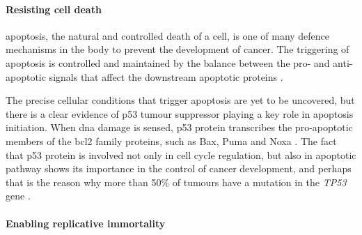 \paragraph{Resisting cell death}

\noindent
\Gls{apoptosis}, the natural and controlled death of a cell, is one of many defence mechanisms in the body to prevent the development of cancer.
The triggering of \gls{apoptosis} is controlled and maintained by the balance between the pro- and anti-apoptotic signals that affect the downstream apoptotic proteins \citep{Hanahan2011}.


The precise cellular conditions that trigger apoptosis are yet to be uncovered, but there is a clear evidence of p53 tumour suppressor playing a key role in apoptosis initiation.
When \acrshort{dna} damage is sensed, p53 protein transcribes the pro-apoptotic members of the \gls{bcl2} family proteins, such as Bax, Puma and Noxa \citep{Fridman2003,Hanahan2011}.
The fact that p53 protein is involved not only in cell cycle regulation, but also in apoptotic pathway shows its importance in the control of cancer development, and perhaps that is the reason why more than 50\% of tumours have a mutation in the \textit{TP53} gene \citep{Levine1997}.

\paragraph{Enabling replicative immortality}

